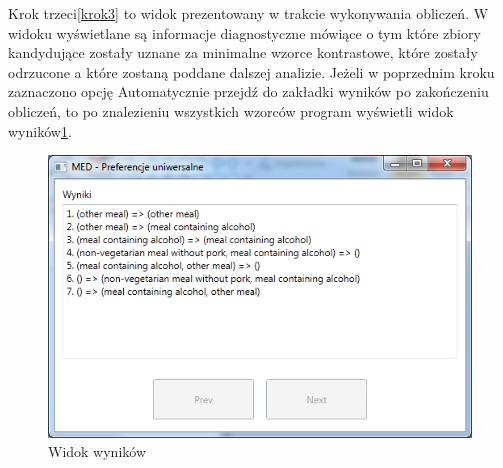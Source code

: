 \documentclass[a4paper,12pt]{article}
\begin{document}
Krok trzeci\ref{krok3} to widok prezentowany w trakcie wykonywania obliczeń. W widoku wyświetlane są informacje diagnostyczne mówiące o tym które zbiory kandydujące zostały uznane za minimalne wzorce kontrastowe, które zostały odrzucone a które zostaną poddane dalszej analizie. Jeżeli w poprzednim kroku zaznaczono opcję Automatycznie przejdź do zakładki wyników po zakończeniu obliczeń, to po znalezieniu wszystkich wzorców program wyświetli widok wyników\ref{krok4}.\\

\begin{figure}[h!]
\begin{center}
\includegraphics[width=\textwidth]{img/4.png}
\caption{Widok wyników}
\label{krok4}
\end{center}
\end{figure}



\end{document}
